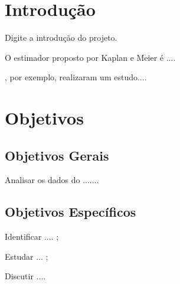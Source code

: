 \documentclass[
	12pt,				%
	openright,			%
	oneside,			%
	a4paper,			%
	brazil				%
	]{abntex2}
\begin{document}
\frenchspacing     %


\imprimircapa

\imprimirfolhaderosto

\tableofcontents*
\cleardoublepage


\textual

\chapter{Introdução}
\bigskip

Digite a introdução do projeto.

\bigskip 
  
O estimador proposto por Kaplan e Meier \cite{kaplan} é .... 

, por exemplo, realizaram um estudo....  

\chapter{Objetivos}

{\section{Objetivos Gerais}}

Analisar os dados do  .......

\section{Objetivos Específicos}

\begin{alineas}
\item Identificar .... ;
\item Estudar ... ;
\item Discutir ....
\end{alineas}
\end{document}
